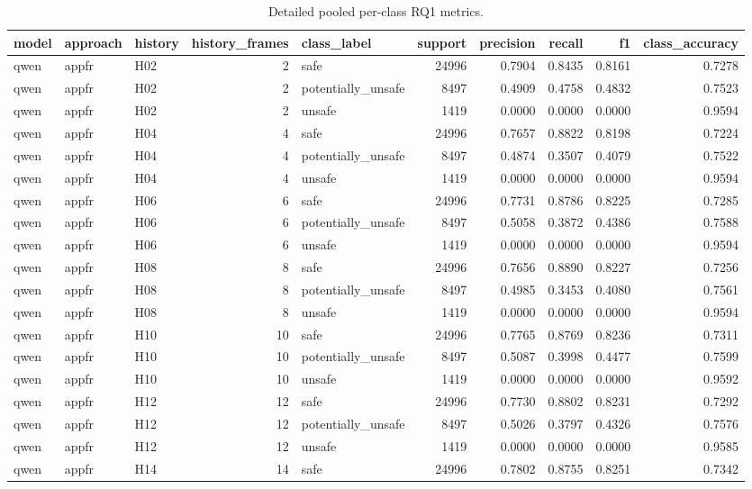 \begin{table}[tbp]
\caption{Detailed pooled per-class RQ1 metrics.}
\label{tab:rq1_per_class_detailed}
\begin{tabular}{lllrlrrrrr}
\toprule
model & approach & history & history\_frames & class\_label & support & precision & recall & f1 & class\_accuracy \\
\midrule
qwen & appfr & H02 & 2 & safe & 24996 & 0.7904 & 0.8435 & 0.8161 & 0.7278 \\
qwen & appfr & H02 & 2 & potentially\_unsafe & 8497 & 0.4909 & 0.4758 & 0.4832 & 0.7523 \\
qwen & appfr & H02 & 2 & unsafe & 1419 & 0.0000 & 0.0000 & 0.0000 & 0.9594 \\
qwen & appfr & H04 & 4 & safe & 24996 & 0.7657 & 0.8822 & 0.8198 & 0.7224 \\
qwen & appfr & H04 & 4 & potentially\_unsafe & 8497 & 0.4874 & 0.3507 & 0.4079 & 0.7522 \\
qwen & appfr & H04 & 4 & unsafe & 1419 & 0.0000 & 0.0000 & 0.0000 & 0.9594 \\
qwen & appfr & H06 & 6 & safe & 24996 & 0.7731 & 0.8786 & 0.8225 & 0.7285 \\
qwen & appfr & H06 & 6 & potentially\_unsafe & 8497 & 0.5058 & 0.3872 & 0.4386 & 0.7588 \\
qwen & appfr & H06 & 6 & unsafe & 1419 & 0.0000 & 0.0000 & 0.0000 & 0.9594 \\
qwen & appfr & H08 & 8 & safe & 24996 & 0.7656 & 0.8890 & 0.8227 & 0.7256 \\
qwen & appfr & H08 & 8 & potentially\_unsafe & 8497 & 0.4985 & 0.3453 & 0.4080 & 0.7561 \\
qwen & appfr & H08 & 8 & unsafe & 1419 & 0.0000 & 0.0000 & 0.0000 & 0.9594 \\
qwen & appfr & H10 & 10 & safe & 24996 & 0.7765 & 0.8769 & 0.8236 & 0.7311 \\
qwen & appfr & H10 & 10 & potentially\_unsafe & 8497 & 0.5087 & 0.3998 & 0.4477 & 0.7599 \\
qwen & appfr & H10 & 10 & unsafe & 1419 & 0.0000 & 0.0000 & 0.0000 & 0.9592 \\
qwen & appfr & H12 & 12 & safe & 24996 & 0.7730 & 0.8802 & 0.8231 & 0.7292 \\
qwen & appfr & H12 & 12 & potentially\_unsafe & 8497 & 0.5026 & 0.3797 & 0.4326 & 0.7576 \\
qwen & appfr & H12 & 12 & unsafe & 1419 & 0.0000 & 0.0000 & 0.0000 & 0.9585 \\
qwen & appfr & H14 & 14 & safe & 24996 & 0.7802 & 0.8755 & 0.8251 & 0.7342 \\

\end{tabular}
\end{table}
